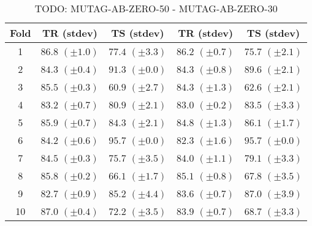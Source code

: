 \documentclass[10pt,a4paper]{book}
\begin{document}
\begin{table}[tbph]
\caption{TODO: MUTAG-AB-ZERO-50 - MUTAG-AB-ZERO-30}
\label{TODO}
\centering
\begin{tabular}{c*{4}{c}}
\toprule
Fold & TR (stdev) & TS (stdev) & TR (stdev) & TS (stdev)\\
\midrule
1 & $86.8$ $(\pm 1.0)$ & $77.4$ $(\pm 3.3)$ & $86.2$ $(\pm 0.7)$ & $75.7$ $(\pm 2.1)$\\
2 & $84.3$ $(\pm 0.4)$ & $91.3$ $(\pm 0.0)$ & $84.3$ $(\pm 0.8)$ & $89.6$ $(\pm 2.1)$\\
3 & $85.5$ $(\pm 0.3)$ & $60.9$ $(\pm 2.7)$ & $84.3$ $(\pm 1.3)$ & $62.6$ $(\pm 2.1)$\\
4 & $83.2$ $(\pm 0.7)$ & $80.9$ $(\pm 2.1)$ & $83.0$ $(\pm 0.2)$ & $83.5$ $(\pm 3.3)$\\
5 & $85.9$ $(\pm 0.7)$ & $84.3$ $(\pm 2.1)$ & $84.8$ $(\pm 1.3)$ & $86.1$ $(\pm 1.7)$\\
6 & $84.2$ $(\pm 0.6)$ & $95.7$ $(\pm 0.0)$ & $82.3$ $(\pm 1.6)$ & $95.7$ $(\pm 0.0)$\\
7 & $84.5$ $(\pm 0.3)$ & $75.7$ $(\pm 3.5)$ & $84.0$ $(\pm 1.1)$ & $79.1$ $(\pm 3.3)$\\
8 & $85.8$ $(\pm 0.2)$ & $66.1$ $(\pm 1.7)$ & $85.1$ $(\pm 0.8)$ & $67.8$ $(\pm 3.5)$\\
9 & $82.7$ $(\pm 0.9)$ & $85.2$ $(\pm 4.4)$ & $83.6$ $(\pm 0.7)$ & $87.0$ $(\pm 3.9)$\\
10 & $87.0$ $(\pm 0.4)$ & $72.2$ $(\pm 3.5)$ & $83.9$ $(\pm 0.7)$ & $68.7$ $(\pm 3.3)$\\
\bottomrule
\end{tabular}
\end{table}


\end{document}
